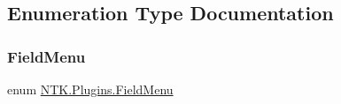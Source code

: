 \subsection{Enumeration Type Documentation}
\mbox{\label{namespace_n_t_k_1_1_plugins_af944b76d225e171a8ed7d3ca5e30667e}} 
\subsubsection{\texorpdfstring{FieldMenu}{FieldMenu}}
{\footnotesize\ttfamily enum \mbox{\hyperlink{namespace_n_t_k_1_1_plugins_af944b76d225e171a8ed7d3ca5e30667e}{N\+T\+K.\+Plugins.\+Field\+Menu}}\hspace{0.3cm}{\ttfamily [strong]}}





